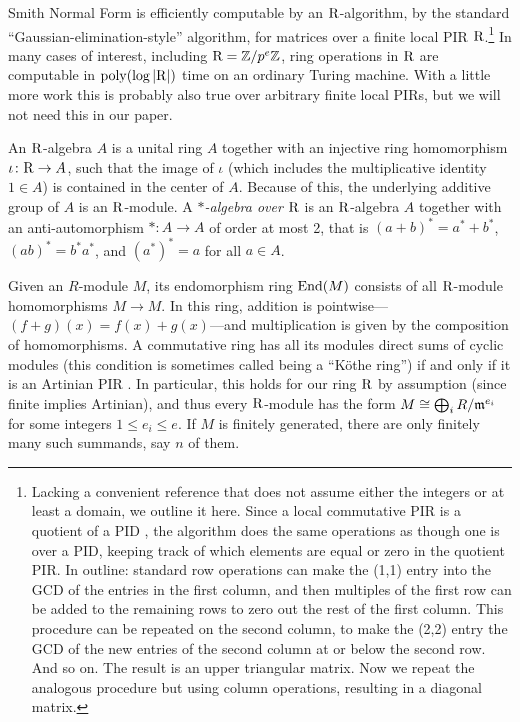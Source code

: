 Smith Normal Form is efficiently computable by an $\mathrm{R}$-algorithm, by the standard ``Gaussian-elimination-style'' algorithm, for matrices over a finite local PIR $\mathrm{R}$.\footnote{Lacking a convenient reference that does not assume either the integers or at least a domain, we outline it here. Since a local commutative PIR is a quotient of a PID \cite{hungerford}, the algorithm does the same operations as though one is over a PID, keeping track of which elements are equal or zero in the quotient PIR. In outline: standard row operations can make the (1,1) entry into the GCD of the entries in the first column, and then multiples of the first row can be added to the remaining rows to zero out the rest of the first column. This procedure can be repeated on the second column, to make the (2,2) entry the GCD of the new entries of the second column at or below the second row. And so on. The result is an upper triangular matrix. Now we repeat the analogous procedure but using column operations, resulting in a diagonal matrix.} In many cases of interest, including $\mathrm{R} = \mathbb{Z}/p^e \mathbb{Z}$, %
ring operations in $\mathrm{R}$ are computable in $\mathrm{poly}(\log|\mathrm{R}|)$ time on an ordinary Turing machine. With a little more work this is probably also true over arbitrary finite local PIRs, but we will not need this in our paper.

An $\mathrm{R}$-algebra $A$ is a unital ring $A$ together with an injective ring homomorphism $\iota \colon \mathrm{R} \to A$, such that the image of $\iota$ (which includes the multiplicative identity $1 \in A$) is contained in the center of $A$. Because of this, the underlying additive group of $A$ is an $\mathrm{R}$-module. A \emph{$*$-algebra over $\mathrm{R}$} is an $\mathrm{R}$-algebra $A$ together with an anti-automorphism $* \colon A \to A$ of order at most 2, that is $(a+b)^* = a^* + b^*$, $(ab)^* = b^* a^*$, and $(a^*)^* = a$ for all $a \in A$. 

Given an $R$-module $M$, its endomorphism ring $\mathrm{End}(M)$ consists of all $\mathrm{R}$-module homomorphisms $M \to M$. In this ring, addition is pointwise---$(f+g)(x) = f(x) + g(x)$---and multiplication is given by the composition of homomorphisms. A commutative ring has all its modules direct sums of cyclic modules (this condition is sometimes called being a ``Köthe ring'') if and only if it is an Artinian PIR \cite{CohenKaplansky, Kothe}. In particular, this holds for our ring $\mathrm{R}$ by assumption (since finite implies Artinian), and thus every $\mathrm{R}$-module has the form $M \cong \bigoplus_i R/\mathfrak{m}^{e_i}$ for some integers $1 \leq e_i \leq e$. If $M$ is finitely generated, there are only finitely many such summands, say $n$ of them. 

